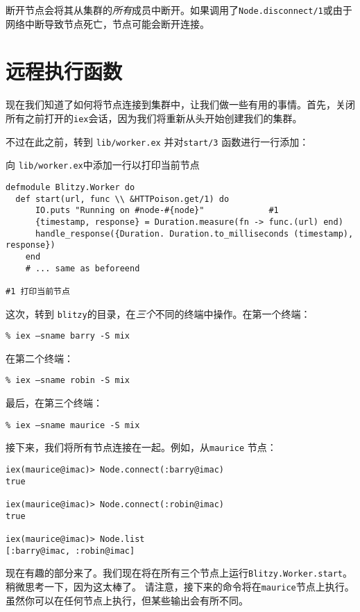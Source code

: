 断开节点会将其从集群的\emph{所有}成员中断开。如果调用了\texttt{Node.disconnect/1}或由于网络中断导致节点死亡，节点可能会断开连接。

\section{远程执行函数}
现在我们知道了如何将节点连接到集群中，让我们做一些有用的事情。首先，关闭所有之前打开的\texttt{iex}会话，因为我们将重新从头开始创建我们的集群。

不过在此之前，转到 \texttt{lib/worker.ex} 并对\texttt{start/3} 函数进行一行添加：

\begin{code}{向 \texttt{lib/worker.ex}中添加一行以打印当前节点}
\begin{verbatim}
defmodule Blitzy.Worker do
  def start(url, func \\ &HTTPoison.get/1) do 
      IO.puts "Running on #node-#{node}"             #1 
      {timestamp, response} = Duration.measure(fn -> func.(url) end) 
      handle_response({Duration. Duration.to_milliseconds (timestamp), response}) 
    end
    # ... same as beforeend

#1 打印当前节点
\end{verbatim}
\end{code}

这次，转到 \texttt{blitzy}的目录，在\emph{三个}不同的终端中操作。在第一个终端：

\texttt{\% iex --sname barry -S mix}

在第二个终端：

\texttt{\% iex --sname robin -S mix}

最后，在第三个终端：

\texttt{\% iex --sname maurice -S mix}

接下来，我们将所有节点连接在一起。例如，从\texttt{maurice} 节点：

\begin{code}{}
\begin{verbatim}
iex(maurice@imac)> Node.connect(:barry@imac)
true

iex(maurice@imac)> Node.connect(:robin@imac)
true

iex(maurice@imac)> Node.list
[:barry@imac, :robin@imac]
\end{verbatim}
\end{code}

现在有趣的部分来了。我们现在将在所有三个节点上运行\texttt{Blitzy.Worker.start}。
稍微思考一下，因为这太棒了。
请注意，接下来的命令将在\texttt{maurice}节点上执行。
虽然你可以在任何节点上执行，但某些输出会有所不同。

